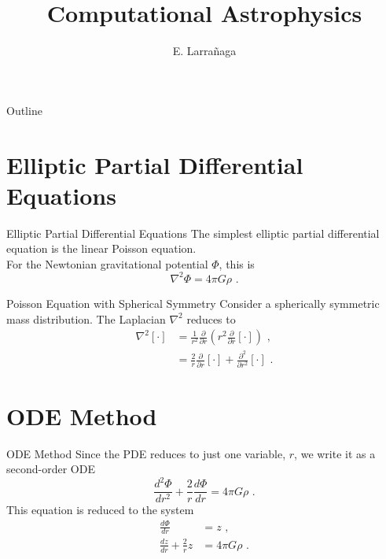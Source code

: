 \documentclass[11pt]{beamer}
\begin{document}
\begin{frame}
\title{Computational Astrophysics}
\author{E. Larrañaga}
\titlepage
\end{frame}

\begin{frame}{Outline}
\tableofcontents
\end{frame}

\section{Elliptic Partial Differential Equations }
\begin{frame}[fragile]{Elliptic Partial Differential Equations}
The simplest elliptic partial differential equation is the linear Poisson equation.\\
For the Newtonian gravitational potential $\Phi$, this is
\begin{equation}
\nabla^2 \Phi =  4\pi G \rho\,\,.
\label{eq:pde_poisson1}
\end{equation}
\end{frame}


\begin{frame}[fragile]{Poisson Equation with Spherical Symmetry}
Consider a spherically symmetric mass
distribution. The Laplacian
$\nabla^2$ reduces to
\begin{equation}
\begin{aligned}
\nabla^2 [\cdot] &= \frac{1}{r^2} \frac{\partial}{\partial r}\left(r^2 \frac{\partial}{\partial r} [\cdot] \right)\,\,,\\
&= \frac{2}{r}\frac{\partial}{\partial r}[\cdot] + \frac{\partial^2}{\partial r^2} [\cdot]\,\,. 
\end{aligned}
\end{equation}
\end{frame}
  
\section{ODE Method}
\begin{frame}[fragile]{ODE Method}
Since the PDE reduces to just one variable, $r$, we write it as a second-order ODE
\begin{equation}
\frac{d^2 \Phi}{d r^2}  + \frac{2}{r}\frac{d \Phi}{d r}  = 4 \pi G\rho\,\,.
\end{equation}
This equation is reduced to the system
\begin{equation}
\begin{aligned}
\frac{d \Phi}{dr} &= z\,\,,\\
\frac{dz}{dr}  + \frac{2}{r} z &= 4 \pi G \rho\,\,.
\end{aligned}
\end{equation}
\end{frame}
\end{document}
